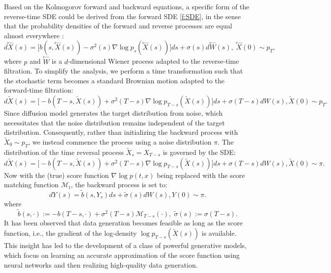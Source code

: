 \documentclass[11pt]{article}
\def\w{\widetilde}
\begin{document}
Based on the Kolmogorov forward and backward equations, a specific form of the reverse-time SDE could be derived from the forward SDE \eqref{f:SDE}, in the sense that the probability densities of the forward and reverse processes are equal almost everywhere \cite{anderson1982reverse}:
\begin{equation}
\label{f:SDE}
d\overset{\leftarrow}{X}(s) = \Big[b(s,\overset{\leftarrow}{X}(s))-\sigma^2(s)\nabla \log p_s(\overset{\leftarrow}{X}(s))\Big]ds + \sigma(s) d\overset{\leftarrow}{W}(s),\; \overset{\leftarrow}{X}(0) \sim p_T, 
\end{equation}
where $p$ and $\overset{\leftarrow}{W}$ is a $d$-dimensional Wiener process adapted to the reverse-time filtration. To simplify the analysis, we perform a time transformation such that the stochastic term becomes a standard Brownian motion adapted to the forward-time filtration:
\begin{equation*}
\label{reverse:SDE}
d\w{X}(s) = \Big[-b(T-s,\w{X}(s))+\sigma^2(T-s)\nabla \log p_{T-s}(\w{X}(s))\Big]ds + \sigma(T-s) dW(s),\w{X}(0) \sim p_T.
\end{equation*}
Since diffusion model generates the target distribution from noise, which necessitates that the noise distribution remains independent of the target distribution. Consequently, rather than initializing the backward process with $\w{X}_{0} \sim p_T$, we instead commence the process using a noise distribution $\pi$. The distribution of the time reversal process $\w{X}_{s} = X_{T-s}$ is governed by the SDE:
\begin{equation}
d\w{X}(s) = \Big[-b(T-s,\w{X}(s))+\sigma^2(T-s) \nabla \log p_{T-s}(\w{X}(s))\Big]ds + \sigma(T-s) dW(s),\w{X}(0) \sim \pi.
\end{equation}
Now with the (true) score function $\nabla\log p(t,x)$ being replaced with the score matching function $\mathcal{M}_t$, the backward process is set to:
\begin{equation}
\label{pretrain:sde}
d{Y}(s) = \w{b}(s,Y_{s})ds + \tilde \sigma(s) dW(s),{Y}(0) \sim \pi.
\end{equation}
where
$$\w{b}(s,\cdot):=-b(T-s,\cdot)+\sigma^2(T-s) \mathcal{M}_{T-s}(\cdot),\;\w{\sigma}(s):=\sigma(T-s).$$ 
It has been observed that data generation becomes feasible as long as the score function,
 i.e., the gradient of the log-density 
$\log p_{T-s}(\w{X}(s))$ is available. This insight has led to the development of a class of powerful generative models, which focus on learning an accurate approximation of the score function using neural networks and then realizing high-quality data generation. 
\end{document}
